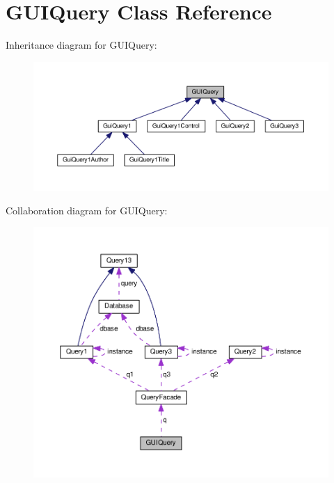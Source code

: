 \hypertarget{classGUIQuery}{}\section{G\+U\+I\+Query Class Reference}
\label{classGUIQuery}


Inheritance diagram for G\+U\+I\+Query\+:\nopagebreak
\begin{figure}[H]
\begin{center}
\leavevmode
\includegraphics[width=350pt]{classGUIQuery__inherit__graph}
\end{center}
\end{figure}


Collaboration diagram for G\+U\+I\+Query\+:\nopagebreak
\begin{figure}[H]
\begin{center}
\leavevmode
\includegraphics[width=350pt]{classGUIQuery__coll__graph}
\end{center}
\end{figure}
